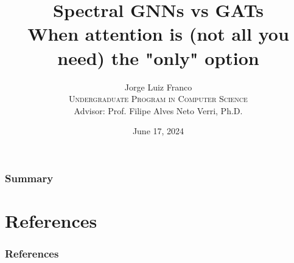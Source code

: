 \documentclass[aspectratio=169,dvipsnames]{beamer}
\title[Spectral GNNs vs GAT
]{Spectral GNNs vs GATs \\ When attention is (not all you need) the "only" option
}
\author[Jorge Luiz Franco]{Jorge Luiz Franco\\ \bigskip
\textsc{Undergraduate Program in Computer Science}\\ \bigskip
Advisor: Prof. Filipe Alves Neto Verri, Ph.D.}
\institute[ICMC/USP]{Universidade de São Paulo - ICMC}
\date[2024]{\footnotesize{June 17, 2024}}
\begin{document}
    
    \begin{frame}[plain]
        \titlepage
    \end{frame}
    
    \begin{frame}
      \frametitle{Summary}
      \tableofcontents
    \end{frame}
    














\section{References}

\begin{frame}[allowframebreaks]
  \frametitle{References}
  
  
  
\end{frame}
\end{document}
